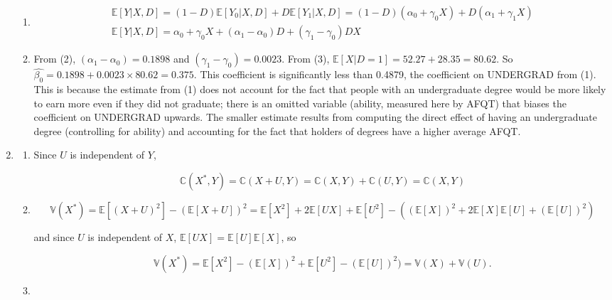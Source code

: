 \documentclass{article}
\begin{document}
\begin{enumerate}
\begin{enumerate}
		\item 

		\begin{gather*}\mathbb{E}[Y|X,D] = (1-D)\mathbb{E}[Y_0|X,D] + D \mathbb{E}[Y_1|X,D] = (1-D)(\alpha_0 + \gamma_0 X) + D (\alpha_1 + \gamma_1 X) \\
		\mathbb{E}[Y|X,D] = \alpha_0 + \gamma_0 X + (\alpha_1 - \alpha_0)D + (\gamma_1 - \gamma_0)DX
		\end{gather*}

		\item

		From (2), $(\alpha_1 - \alpha_0) = 0.1898$ and $(\gamma_1 - \gamma_0) = 0.0023$. From (3), $\mathbb{E}[X|D=1] = 52.27 + 28.35 = 80.62$. So $\hat{\beta_0} = 0.1898 + 0.0023 \times 80.62 = 0.375$. This coefficient is significantly less than 0.4879, the coefficient on UNDERGRAD from (1). This is because the estimate from (1) does not account for the fact that people with an undergraduate degree would be more likely to earn more even if they did not graduate; there is an omitted variable (ability, measured here by AFQT) that biases the coefficient on UNDERGRAD upwards. The smaller estimate results from computing the direct effect of having an undergraduate degree (controlling for ability) and accounting for the fact that holders of degrees have a higher average AFQT.

	\end{enumerate}

	\item

	\begin{enumerate}

		\item Since $U$ is independent of $Y$,

		$$\mathbb{C}(X^*,Y) = \mathbb{C}(X+U,Y) = \mathbb{C}(X,Y) + \mathbb{C}(U,Y) = \mathbb{C}(X,Y)$$

		\item 

		$$\mathbb{V}(X^*) = \mathbb{E}[(X+U)^2] - (\mathbb{E}[X+U])^2 = \mathbb{E}[X^2] + 2\mathbb{E}[UX] + \mathbb{E}[U^2] - ((\mathbb{E}[X])^2 + 2 \mathbb{E}[X]\mathbb{E}[U] + (\mathbb{E}[U])^2)$$

		and since $U$ is independent of $X$, $\mathbb{E}[UX] = \mathbb{E}[U]\mathbb{E}[X]$, so 

		$$\mathbb{V}(X^*) = \mathbb{E}[X^2] - (\mathbb{E}[X])^2 + \mathbb{E}[U^2] - (\mathbb{E}[U])^2) = \mathbb{V}(X) + \mathbb{V}(U).$$

		\item


\end{enumerate}
\end{enumerate}
\end{document}
